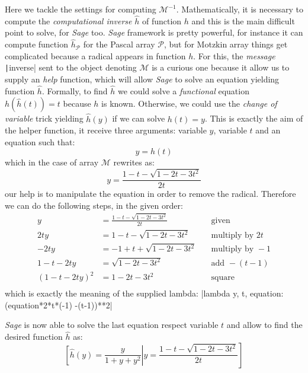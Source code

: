 Here we tackle the settings for computing $\mathcal{M}^{-1}$. Mathematically,
it is necessary to compute the \emph{computational inverse} $\hat{h}$ of
function $h$ and this is the main difficult point to solve, for \emph{Sage}
\cite{sage} too.  \emph{Sage} framework is pretty powerful, for instance it can
compute function $\hat{h}_{\mathcal{P}}$ for the Pascal array $\mathcal{P}$,
but for Motzkin array things get complicated because a radical appears in
function $h$. For this, the \emph{message} \texttt|inverse| sent to
the object denoting $\mathcal{M}$ is a curious one because it allow us to
supply an \emph{help} function, which will allow \emph{Sage} to solve an
equation yielding function $\hat{h}$. Formally, to find $\hat{h}$ we could
solve a \emph{functional} equation $h(\hat{h}(t))=t$ because $h$ is known.
Otherwise, we could use the \emph{change of variable} trick yielding
$\hat{h}(y)$ if we can solve $h(t)=y$. This is exactly the aim of the helper
function, it receive three arguments: variable $y$, variable $t$ and an equation
such that:
\begin{displaymath}
    y=h(t)
\end{displaymath}
which in the case of array $\mathcal{M}$ rewrites as:
\begin{displaymath}
    y=\frac{1-t-\sqrt{1-2t-3t^{2}}}{2t}
\end{displaymath}
our help is to manipulate the equation in order to remove the radical. Therefore
we can do the following steps, in the given order:
\begin{displaymath}
    \begin{split}
        y&=\frac{1-t-\sqrt{1-2t-3t^{2}}}{2t} &\quad\text{given}\\
        2ty &=1-t-\sqrt{1-2t-3t^{2}} &\quad\text{multiply by } 2t\\
        -2ty &=-1+t+\sqrt{1-2t-3t^{2}} &\quad\text{multiply by } -1\\
        1-t-2ty &=\sqrt{1-2t-3t^{2}} &\quad\text{add } -(t-1)\\
        \left(1-t-2ty\right)^{2} &=1-2t-3t^{2} &\quad\text{square}\\
    \end{split}
\end{displaymath}
which is exactly the meaning of the supplied lambda: |lambda y, t,
equation: (equation*2*t*(-1) -(t-1))**2| 

\emph{Sage} is now able to solve the last equation respect variable $t$ and allow
to find the desired function $\hat{h}$ as:
\begin{displaymath}
    \left.\left[\hat{h}(y)=\frac{y}{1+y+y^{2}}\right|
        y=\frac{1-t-\sqrt{1-2t-3t^{2}}}{2t} \right]
\end{displaymath}

